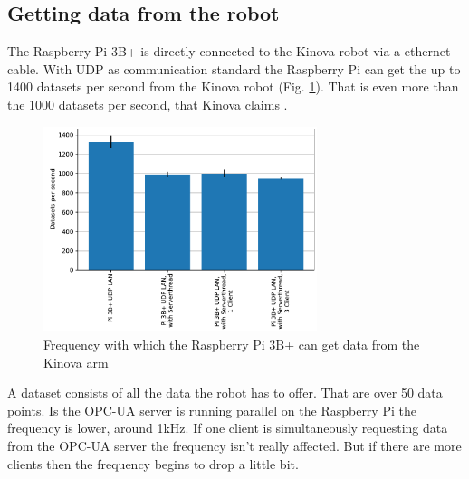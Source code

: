 \documentclass[conference]{IEEEtran}
\begin{document}
\subsection{Getting data from the robot}
The Raspberry Pi 3B+ is directly connected to the Kinova robot via a ethernet cable.
With UDP as communication standard the Raspberry Pi can get the up to 1400 datasets per second from the Kinova robot (Fig. \ref{fig:KortexAPISpeed}).
That is even more than the 1000 datasets per second, that Kinova claims \cite{KortexUDP}.
\begin{figure}[htbp]
    \centerline{\includegraphics[width=8cm]{Pictures/KortexAPISpeed.pdf}}
    \caption{Frequency with which the Raspberry Pi 3B+ can get data from the Kinova arm}
    \label{fig:KortexAPISpeed}
\end{figure}
A dataset consists of all the data the robot has to offer. That are over 50 data points.
Is the OPC-UA server is running parallel on the Raspberry Pi the frequency is lower, around 1kHz.
If one client is simultaneously requesting data from the OPC-UA server the frequency isn't really affected.
But if there are more clients then the frequency begins to drop a little bit.
\end{document}
